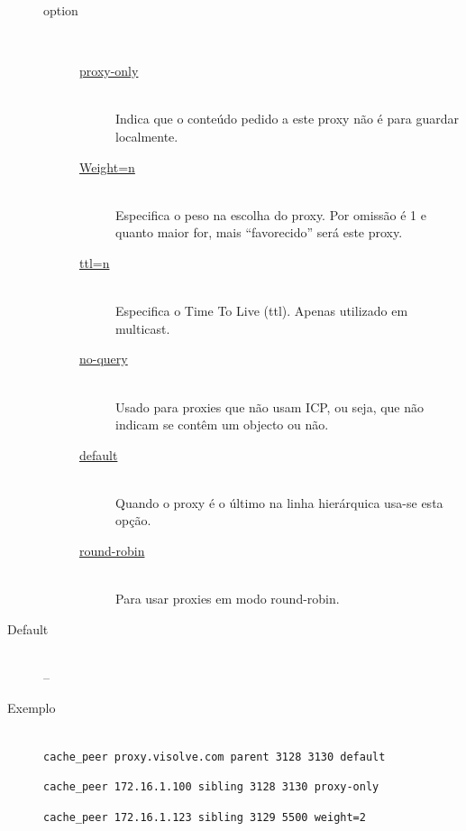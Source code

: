 \begin{description}
\begin{description}
\item[option]~\\
\begin{description}
\item[\href{http://squid.visolve.com/squid/squid24s1/glossary.htm\#proxy-only}{proxy-only}]~\\
Indica que o conteúdo pedido a este proxy não é para guardar localmente.

\item[\href{http://squid.visolve.com/squid/squid24s1/glossary.htm\#weight}{Weight=n}]~\\
Especifica o peso na escolha do proxy.
Por omissão é 1 e quanto maior for, mais ``favorecido'' será este proxy.

\item[\href{http://squid.visolve.com/squid/squid24s1/glossary.htm\#ttl}{ttl=n}]~\\
Especifica o Time To Live (ttl). Apenas utilizado em multicast.

\item[\href{http://squid.visolve.com/squid/squid24s1/glossary.htm\#no-query}{no-query}]~\\
Usado para proxies que não usam ICP, ou seja, que não indicam se
contêm um objecto ou não.

\item[\href{http://squid.visolve.com/squid/squid24s1/glossary.htm\#default}{default}]~\\
Quando o proxy é o último na linha hierárquica usa-se esta
opção.

\item[\href{http://squid.visolve.com/squid/squid24s1/glossary.htm\#round-robin}{round-robin}]~\\
Para usar proxies em modo round-robin.
\end{description}
\end{description}

\item[Default]~\\
--

\item[Exemplo]~\\
\texttt{cache\_peer proxy.visolve.com parent 3128 3130 default}

\texttt{cache\_peer 172.16.1.100 sibling 3128 3130 proxy-only}

\texttt{cache\_peer 172.16.1.123 sibling 3129 5500 weight=2}
\end{description}


